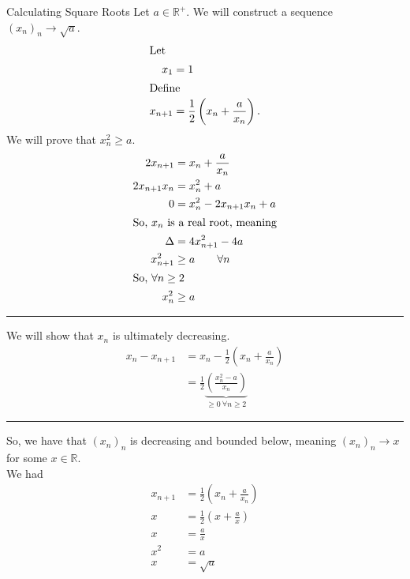 \documentclass[8pt]{extarticle}
\newcommand{\R}{\mathbb{R}}
\begin{document}
  \begin{problem}{Calculating Square Roots}
    Let $a\in\R^+$. We will construct a sequence $\left(x_n\right)_n \rightarrow \sqrt{a}$.
    \begin{align*}
      \shortintertext{Let}
      x_{1} &= 1\\
      \shortintertext{Define}
      x_{n+1} &= \frac{1}{2}\left(x_{n} + \frac{a}{x_n}\right).
    \end{align*}
    \tcblower
    We will prove that $x_{n}^2 \geq a$.
    \begin{align*}
      2x_{n+1} &= x_{n} + \frac{a}{x_n}\\
      2x_{n+1}x_n &= x_{n}^2 + a\\
      0 &= x_{n}^2 - 2x_{n+1}x_{n} + a\\
      \shortintertext{So, $x_{n}$ is a real root, meaning}
      \Delta &= 4x_{n+1}^2 - 4a\\
      x_{n+1}^2 &\geq a \tag*{$\forall n$}\\
      \shortintertext{So, $\forall n\geq 2$}
      x_{n}^2 &\geq a
    \end{align*}
    \vspace{4pt}
    \rule{\textwidth}{0.4pt}
    \vspace{4pt}
    We will show that $x_n$ is ultimately decreasing.
    \begin{align*}
      x_n - x_{n+1} &= x_{n} - \frac{1}{2}\left(x_n + \frac{a}{x_n}\right)\\
                    &= \frac{1}{2}\underbrace{\left(\frac{x_n^2 - a}{x_n}\right)}_{\geq 0~\forall n\geq 2}
    \end{align*}
    \vspace{4pt}
    \rule{\textwidth}{0.4pt}
    \vspace{4pt}
    So, we have that $\left(x_n\right)_n$ is decreasing and bounded below, meaning $(x_n)_n \rightarrow x$ for some $x\in\R$.\\

    We had
    \begin{align*}
      x_{n+1} &= \frac{1}{2}\left(x_n + \frac{a}{x_n}\right)\\
      x &= \frac{1}{2}\left(x + \frac{a}{x}\right)\\
      x &= \frac{a}{x}\\
      x^2 &= a\\
      x &= \sqrt{a} \tag*{remember that $x > 0$}
    \end{align*}
  \end{problem}
\end{document}
